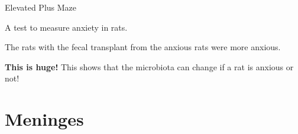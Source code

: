 \begin{coloredlist}
\begin{coloredlist}
\begin{coloredlist}
            \item Elevated Plus Maze
            \begin{coloredlist}
                \item A test to measure anxiety in rats.
                \item The rats with the fecal transplant from the anxious rats were more anxious.
                \item \textbf{This is huge!} This shows that the microbiota can change if a rat is anxious or not!
            \end{coloredlist}
        \end{coloredlist}
    \end{coloredlist}
\end{coloredlist}

\section{Meninges}

